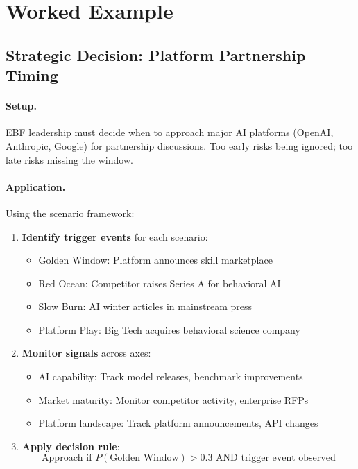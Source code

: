 \section{Worked Example}
\label{sec:vvv1-example}

\subsection{Strategic Decision: Platform Partnership Timing}

\paragraph{Setup.}
EBF leadership must decide when to approach major AI platforms (OpenAI,
Anthropic, Google) for partnership discussions. Too early risks being
ignored; too late risks missing the window.

\paragraph{Application.}
Using the scenario framework:

\begin{enumerate}
\item \textbf{Identify trigger events} for each scenario:
    \begin{itemize}
    \item Golden Window: Platform announces skill marketplace
    \item Red Ocean: Competitor raises Series A for behavioral AI
    \item Slow Burn: AI winter articles in mainstream press
    \item Platform Play: Big Tech acquires behavioral science company
    \end{itemize}

\item \textbf{Monitor signals} across axes:
    \begin{itemize}
    \item AI capability: Track model releases, benchmark improvements
    \item Market maturity: Monitor competitor activity, enterprise RFPs
    \item Platform landscape: Track platform announcements, API changes
    \end{itemize}

\item \textbf{Apply decision rule}:
\begin{equation}
\text{Approach if } P(\text{Golden Window}) > 0.3 \text{ AND trigger event observed}
\end{equation}
\end{enumerate}

